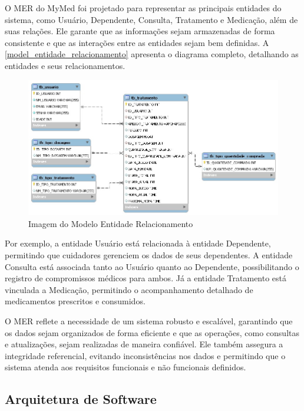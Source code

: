 \documentclass[
	article,			%
	12pt,				%
	oneside,			%
	a4paper,			%
    BIBLATEX,           %
	english,			%
	brazil,				%
	sumario=tradicional
	]{abntex2}
\begin{document}
O MER do MyMed foi projetado para representar as principais entidades do sistema, como Usuário, Dependente, Consulta, Tratamento e Medicação, além de suas relações. Ele garante que as informações sejam armazenadas de forma consistente e que as interações entre as entidades sejam bem definidas. A \autoref{model_entidade_relacionamento} apresenta o diagrama completo, detalhando as entidades e seus relacionamentos.

\begin{figure}[!htbp]
    \centering
    \includegraphics[width=1.0\linewidth]{assets/figuras/bancoDados.jpg}
    \caption{Imagem do Modelo Entidade Relacionamento}
    \label{model_entidade_relacionamento}
\end{figure}

Por exemplo, a entidade Usuário está relacionada à entidade Dependente, permitindo que cuidadores gerenciem os dados de seus dependentes. A entidade Consulta está associada tanto ao Usuário quanto ao Dependente, possibilitando o registro de compromissos médicos para ambos. Já a entidade Tratamento está vinculada a Medicação, permitindo o acompanhamento detalhado de medicamentos prescritos e consumidos.

O MER reflete a necessidade de um sistema robusto e escalável, garantindo que os dados sejam organizados de forma eficiente e que as operações, como consultas e atualizações, sejam realizadas de maneira confiável. Ele também assegura a integridade referencial, evitando inconsistências nos dados e permitindo que o sistema atenda aos requisitos funcionais e não funcionais definidos.

\subsection{Arquitetura de Software}
\end{document}
